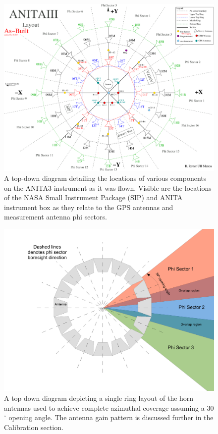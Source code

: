 \begin{figure}
\centering
	\includegraphics[width=\textwidth]{figures/ANITA3_layout_asBuilt}
	\caption{A top-down diagram detailing the locations of various components on the ANITA3 instrument as it was flown.  Visible are the locations of the NASA Small Instrument Package (SIP) and ANITA instrument box as they relate to the GPS antennas and measurement antenna phi sectors.}
	\label{fig:ANITA3_asBuilt}
\end{figure}

\begin{figure}
\centering
	\includegraphics[width=\textwidth]{figures/phiSectors} 
	\caption{A top down diagram depicting a single ring layout of the horn antennas used to achieve complete azimuthal coverage assuming a 30$^{\circ}$  opening angle.  The antenna gain pattern is discussed further in the Calibration section.}
	\label{fig:phiSectors}
\end{figure}

